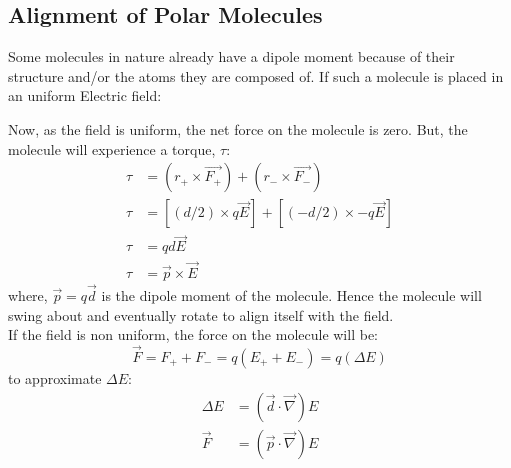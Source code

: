\documentclass{article}
\begin{document}
\subsection{Alignment of Polar Molecules}
Some molecules in nature already have a dipole moment because of their structure and/or the atoms they are composed of.
If such a molecule is placed in an uniform Electric field:\\
Now, as the field is uniform, the net force on the molecule is zero.
But, the molecule will experience a torque, $\tau$:
\begin{align*}
    \tau &= (r_+ \times \vec{F_+}) + (r_- \times \vec{F_-})\\
    \tau &= [(d/2) \times q \vec{E}] + [(-d/2) \times -q \vec{E}]\\
    \tau &= qd \vec{E}\\
    \tau &= \vec{p} \times \vec{E}
\end{align*}
where, $\vec{p} = q \vec{d}$ is the dipole moment of the molecule.
Hence the molecule will swing about and eventually rotate to align itself with the field. \\
If the field is non uniform, the force on the molecule will be:
\[ \vec{F} = F_+ + F_- = q(E_+ + E_-) = q (\Delta E)\]
to approximate $\Delta E$:
\begin{align*} 
\Delta E &= \left(\vec{d} \cdot \vec{\nabla} \right) E \\
\vec{F} &= \left(\vec{p} \cdot \vec{\nabla} \right) E
\end{align*}
\end{document}
